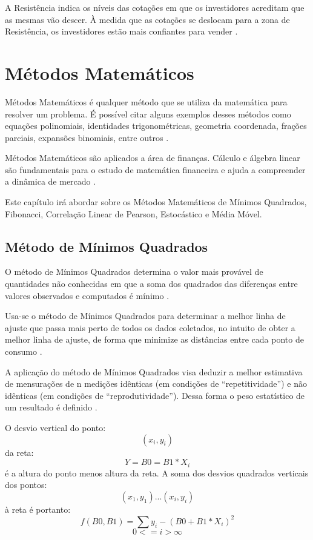 A Resistência indica os níveis das cotações em que os investidores acreditam que as mesmas vão descer. À medida que as cotações se deslocam para a zona de Resistência, os investidores estão mais confiantes para vender \cite{collins2012}.

\section{Métodos Matemáticos}

Métodos Matemáticos é qualquer método que se utiliza da matemática para resolver um problema. É possível citar alguns exemplos desses métodos como equações polinomiais, identidades trigonométricas, geometria coordenada, frações parciais, expansões binomiais, entre outros \cite{riley2011}.

Métodos Matemáticos são aplicados a área de finanças. Cálculo e álgebra linear são fundamentais para o estudo de matemática financeira e ajuda a compreender a dinâmica de mercado \cite{konis2014}.

Este capítulo irá abordar sobre os Métodos Matemáticos de Mínimos Quadrados, Fibonacci, Correlação Linear de Pearson, Estocástico e Média Móvel.
\subsection{Método de Mínimos Quadrados}

O método de Mínimos Quadrados determina o valor mais provável de quantidades não conhecidas em que a soma dos quadrados das diferenças entre valores observados e computados é mínimo \cite[pág.~72]{inacio2010}.

Usa-se o método de Mínimos Quadrados para determinar a melhor linha de ajuste que passa mais perto de todos os dados coletados, no intuito de obter a melhor linha de ajuste, de forma que minimize as distâncias entre cada ponto de consumo \cite[pág.~46]{dias1985}.

A aplicação do método de Mínimos Quadrados visa deduzir a melhor estimativa de mensurações de n medições idênticas (em condições de “repetitividade”) e não idênticas (em condições de “reprodutividade”). Dessa forma o peso estatístico de um resultado é definido \cite[pág.~149]{vuolo1996}.

O desvio vertical do ponto:
\begin{equation}
(x_{i}, y_{i})
\end{equation}
da reta:
\begin{equation}
Y = B0 = B1*X_{i}
\end{equation}
é a altura do ponto menos altura da reta. A soma dos desvios quadrados verticais dos pontos:
\begin{equation}
(x_{1}, y_{1})...(x_{i}, y_{i})
\end{equation}
à reta é portanto:
\begin{equation}
f(B0,B1) = \sum{y_{i} - (B0 + B1 * X_{i})}^2
\end{equation}
\begin{equation}
0 <= i > \infty
\end{equation}

